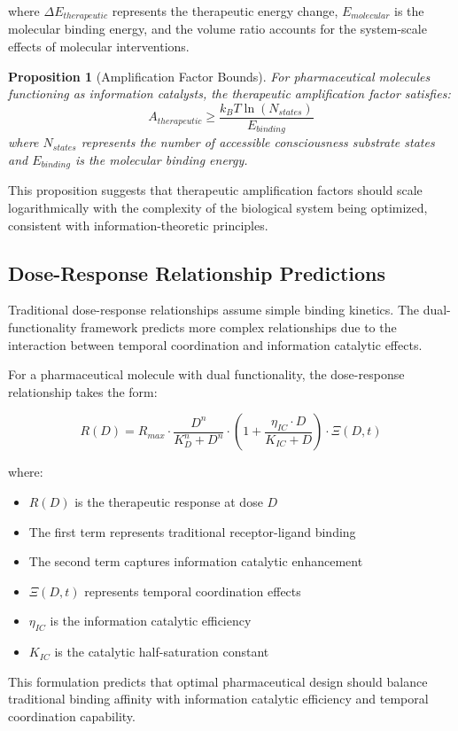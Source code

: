 \documentclass[12pt,a4paper]{article}
\newtheorem{proposition}[theorem]{Proposition}
\begin{document}
where $\Delta E_{therapeutic}$ represents the therapeutic energy change, $E_{molecular}$ is the molecular binding energy, and the volume ratio accounts for the system-scale effects of molecular interventions.

\begin{proposition}[Amplification Factor Bounds]
For pharmaceutical molecules functioning as information catalysts, the therapeutic amplification factor satisfies:
$$A_{therapeutic} \geq \frac{k_B T \ln(N_{states})}{E_{binding}}$$
where $N_{states}$ represents the number of accessible consciousness substrate states and $E_{binding}$ is the molecular binding energy.
\end{proposition}

This proposition suggests that therapeutic amplification factors should scale logarithmically with the complexity of the biological system being optimized, consistent with information-theoretic principles.

\subsection{Dose-Response Relationship Predictions}

Traditional dose-response relationships assume simple binding kinetics. The dual-functionality framework predicts more complex relationships due to the interaction between temporal coordination and information catalytic effects.

For a pharmaceutical molecule with dual functionality, the dose-response relationship takes the form:

$$R(D) = R_{max} \cdot \frac{D^n}{K_D^n + D^n} \cdot \left(1 + \frac{\eta_{IC} \cdot D}{K_{IC} + D}\right) \cdot \Xi(D, t)$$

where:
\begin{itemize}
\item $R(D)$ is the therapeutic response at dose $D$
\item The first term represents traditional receptor-ligand binding
\item The second term captures information catalytic enhancement
\item $\Xi(D, t)$ represents temporal coordination effects
\item $\eta_{IC}$ is the information catalytic efficiency
\item $K_{IC}$ is the catalytic half-saturation constant
\end{itemize}

This formulation predicts that optimal pharmaceutical design should balance traditional binding affinity with information catalytic efficiency and temporal coordination capability.
\end{document}
